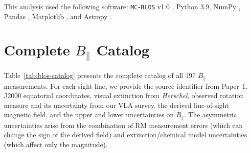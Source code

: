 \documentclass[twocolumn]{aastex701}
\begin{document}
This analysis used the following software: \texttt{MC-BLOS} v1.0 \citep{tahani2025mcblos}, Python 3.9, NumPy \citep{harris2020array}, Pandas \citep{mckinney2010data}, Matplotlib \citep{hunter2007matplotlib}, and Astropy \citep{astropy2022}.

\begin{acknowledgments}
\end{acknowledgments}





\appendix
\section{Complete $B_\parallel$ Catalog}
\label{app:catalog}

Table~\ref{tab:blos-catalog} presents the complete catalog of all 197 $B_\parallel$ measurements. For each sight line, we provide the source identifier from Paper~I, J2000 equatorial coordinates, visual extinction from \textit{Herschel}, observed rotation measure and its uncertainty from our VLA survey, the derived line-of-sight magnetic field, and the upper and lower uncertainties on $B_\parallel$. The asymmetric uncertainties arise from the combination of RM measurement errors (which can change the sign of the derived field) and extinction/chemical model uncertainties (which affect only the magnitude).

\onecolumn

\end{document}
